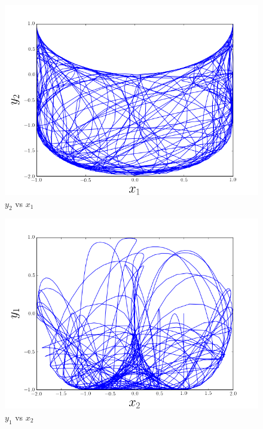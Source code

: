 \documentclass[a4paper,10pt]{article}
\numberwithin{equation}{section}
\begin{document}
\begin{figure}[H]
\center
\includegraphics[scale=0.5]{problema2fig3}
\caption{$y_2$ vs $x_1$}
\label{fig:problema2fig3}
\end{figure}

\begin{figure}[H]
\center
\includegraphics[scale=0.5]{problema2fig4}
\caption{$y_1$ vs $x_2$}
\label{fig:problema2fig4}
\end{figure}
\end{document}
